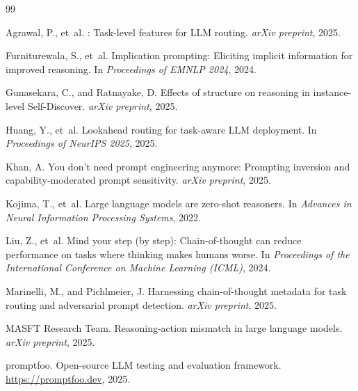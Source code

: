 \documentclass[11pt,a4paper]{article}
\begin{document}

\begin{thebibliography}{99}

Agrawal, P., et~al.
: Task-level features for LLM routing.
\newblock \emph{arXiv preprint}, 2025.

Furniturewala, S., et~al.
\newblock Implication prompting: Eliciting implicit information for improved
  reasoning.
\newblock In \emph{Proceedings of EMNLP 2024}, 2024.

Gunasekara, C., and Ratnayake, D.
\newblock Effects of structure on reasoning in instance-level {Self-Discover}.
\newblock \emph{arXiv preprint}, 2025.

Huang, Y., et~al.
\newblock Lookahead routing for task-aware LLM deployment.
\newblock In \emph{Proceedings of NeurIPS 2025}, 2025.

Khan, A.
\newblock You don't need prompt engineering anymore: Prompting inversion
  and capability-moderated prompt sensitivity.
\newblock \emph{arXiv preprint}, 2025.

Kojima, T., et~al.
\newblock Large language models are zero-shot reasoners.
\newblock In \emph{Advances in Neural Information Processing Systems}, 2022.

Liu, Z., et~al.
\newblock Mind your step (by step): Chain-of-thought can reduce performance
  on tasks where thinking makes humans worse.
\newblock In \emph{Proceedings of the International Conference on Machine
  Learning (ICML)}, 2024.

Marinelli, M., and Pichlmeier, J.
\newblock Harnessing chain-of-thought metadata for task routing and
  adversarial prompt detection.
\newblock \emph{arXiv preprint}, 2025.

{MASFT Research Team}.
\newblock Reasoning-action mismatch in large language models.
\newblock \emph{arXiv preprint}, 2025.

{promptfoo}.
\newblock Open-source LLM testing and evaluation framework.
\newblock \url{https://promptfoo.dev}, 2025.


\end{thebibliography}
\end{document}
